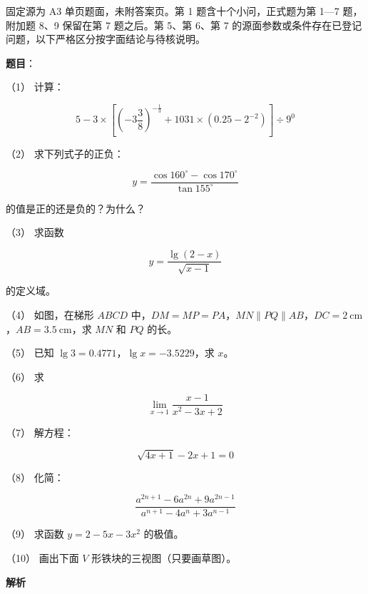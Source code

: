 

\begin{gktip}
固定源为 A3 单页题面，未附答案页。第 1 题含十个小问，正式题为第 1—7 题，附加题 8、9 保留在第 7 题之后。第 5、第 6、第 7 的源面参数或条件存在已登记问题，以下严格区分按字面结论与待核说明。
\end{gktip}

\begin{answer}

\textbf{题目}：

（1） 计算：

\nopagebreak[4]
\[
5-3\times\left[\left(-3\frac38\right)^{-\frac13}+1031\times\left(0.25-2^{-2}\right)\right]\div9^0
\]

（2） 求下列式子的正负：

\nopagebreak[4]
\[
y=\frac{\cos160^\circ-\cos170^\circ}{\tan155^\circ}
\]

的值是正的还是负的？为什么？

（3） 求函数

\nopagebreak[4]
\[
y=\frac{\lg(2-x)}{\sqrt{x-1}}
\]

的定义域。

（4） 如图，在梯形 $ABCD$ 中，$DM=MP=PA$，$MN\parallel PQ\parallel AB$，$DC=2\ \mathrm{cm}$，$AB=3.5\ \mathrm{cm}$，求 $MN$ 和 $PQ$ 的长。
\nopagebreak[4]
\begin{center}\end{center}
\nopagebreak[4]
（5） 已知 $\lg3=0.4771$，$\lg x=-3.5229$，求 $x$。

（6） 求

\nopagebreak[4]
\[
\lim_{x\to1}\frac{x-1}{x^2-3x+2}
\]

（7） 解方程：

\nopagebreak[4]
\[
\sqrt{4x+1}-2x+1=0
\]

（8） 化简：

\nopagebreak[4]
\[
\frac{a^{2n+1}-6a^{2n}+9a^{2n-1}}{a^{n+1}-4a^n+3a^{n-1}}
\]

（9） 求函数 $y=2-5x-3x^2$ 的极值。

（10） 画出下面 $V$ 形铁块的三视图（只要画草图）。
\nopagebreak[4]
\begin{center}\end{center}
\nopagebreak[4]
\textbf{解析}


\end{answer}
